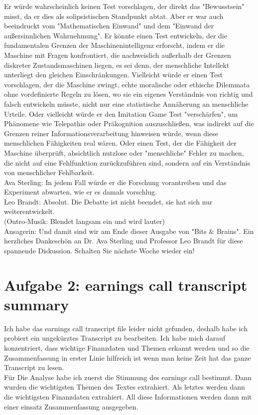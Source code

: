 \documentclass[a4paper,12pt]{scrartcl}
\begin{document}
Er würde wahrscheinlich keinen Test vorschlagen, der direkt das "Bewusstsein" misst, da er dies als solipsistischen Standpunkt abtat. Aber er war auch beeindruckt vom "Mathematischen Einwand" und dem "Einwand der außersinnlichen Wahrnehmung". Er könnte einen Test entwickeln, der die fundamentalen Grenzen der Maschinenintelligenz erforscht, indem er die Maschine mit Fragen konfrontiert, die nachweislich außerhalb der Grenzen diskreter Zustandsmaschinen liegen, es sei denn, der menschliche Intellekt unterliegt den gleichen Einschränkungen. Vielleicht würde er einen Test vorschlagen, der die Maschine zwingt, echte moralische oder ethische Dilemmata ohne vordefinierte Regeln zu lösen, wo sie ein eigenes Verständnis von richtig und falsch entwickeln müsste, nicht nur eine statistische Annäherung an menschliche Urteile. Oder vielleicht würde er den Imitation Game Test "verschärfen", um Phänomene wie Telepathie oder Präkognition auszuschließen, was indirekt auf die Grenzen reiner Informationsverarbeitung hinweisen würde, wenn diese menschlichen Fähigkeiten real wären. Oder einen Test, der die Fähigkeit der Maschine überprüft, absichtlich nutzlose oder "menschliche" Fehler zu machen, die nicht auf eine Fehlfunktion zurückzuführen sind, sondern auf ein Verständnis von menschlicher Fehlbarkeit.\\
Ava Sterling: In jedem Fall würde er die Forschung vorantreiben und das Experiment abwarten, wie er es damals vorschlug.\\
Leo Brandt: Absolut. Die Debatte ist nicht beendet, sie hat sich nur weiterentwickelt.\\
(Outro-Musik: Blendet langsam ein und wird lauter)\\
Ansagerin: Und damit sind wir am Ende dieser Ausgabe von "Bits \& Brains". Ein herzliches Dankeschön an Dr. Ava Sterling und Professor Leo Brandt für diese spannende Diskussion. Schalten Sie nächste Woche wieder ein!\\

\section*{Aufgabe 2: earnings call transcript summary}
Ich habe das earnings call transcript file leider nicht gefunden, deshalb habe ich probiert ein ungekürztes Transcript zu bearbeiten. Ich habe mich darauf konzentriert, dass wichtige Finanzdaten und Themen erkannt werden und so die Zusammenfassung in erster Linie hilfreich ist wenn man keine Zeit hat das ganze Transcript zu lesen.\\
Für Die Analyse habe ich zuerst die Stimmung des earnings call bestimmt. Dann wurden die wichtigsten Themen des Textes extrahiert. Als letztes werden dann die wichtigsten Finanzdaten extrahiert. All diese Informationen werden dann mit einer einsatz Zusammenfassung ausgegeben.\\
\end{document}
